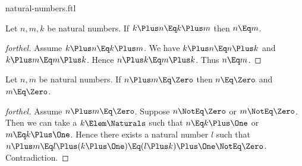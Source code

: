 \documentclass{stex}
\begin{document}
\begin{smodule}{natural-numbers.ftl}
\begin{proposition*}[forthel,name=left-cancellability of addition]
  Let $n, m, k$ be natural numbers.
  If $k \Plus n \Eq k \Plus m$ then $n \Eq m$.
\end{proposition*}
\begin{proof}[forthel]
  Assume $k \Plus n \Eq k \Plus m$.
  We have $k \Plus n \Eq n \Plus k$ and $k \Plus m \Eq m \Plus k$.
  Hence $n \Plus k \Eq m \Plus k$.
  Thus $n \Eq m$.
\end{proof}

\begin{proposition*}[forthel]
  Let $n, m$ be natural numbers.
  If $n \Plus m \Eq \Zero$ then $n \Eq \Zero$ and $m \Eq \Zero$.
\end{proposition*}
\begin{proof}[forthel]
  Assume $n \Plus m \Eq \Zero$.
  Suppose $n \NotEq \Zero$ or $m \NotEq \Zero$.
  Then we can take a $k \Elem \Naturals$ such that $n \Eq k \Plus \One$ or $m \Eq k \Plus \One$.
  Hence there exists a natural number $l$ such that
  $n \Plus m
    \Eq l \Plus (k \Plus \One)
    \Eq (l \Plus k) \Plus \One
    \NotEq \Zero$.
  Contradiction.
\end{proof}

\end{smodule}
\end{document}
